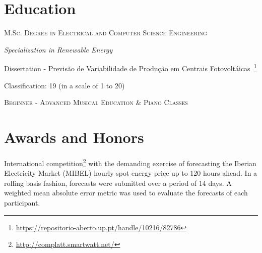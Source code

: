 \documentclass{mycv}
\begin{document}
\section{Education}{

\textsc{M.Sc. Degree in Electrical and Computer Science Engineering}

\textit{Specialization in Renewable Energy}

\begin{myitemize}
	\item Dissertation - Previs\~{a}o de Variabilidade de Produ\c{c}\~{a}o em Centrais Fotovolt\'{a}icas~\footnote{\url{https://repositorio-aberto.up.pt/handle/10216/82786}}
	\begin{myitemize}
		\item Classification: 19 (in a scale of 1 to 20)
	\end{myitemize}
\end{myitemize}


\vspace{0.05cm}

\textsc{Beginner - Advanced Musical Education \& Piano Classes}


\vspace{0.3cm}

\section{Awards and Honors}



International competition\footnote{\url{http://complatt.smartwatt.net/}} with the demanding exercise of forecasting the Iberian Electricity Market (MIBEL) hourly spot energy price up to 120 hours ahead. In a rolling basis fashion, forecasts were submitted over a period of 14 days. A weighted mean absolute error metric was used to evaluate the forecasts of each participant.

}
\end{document}
